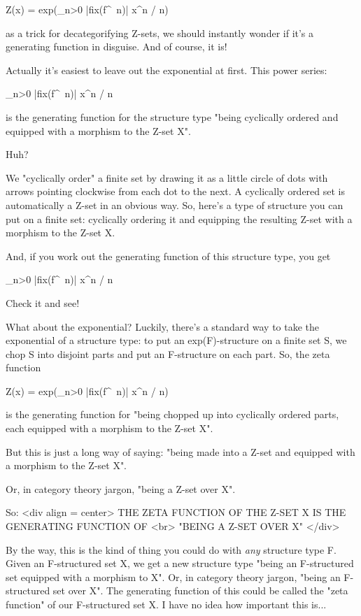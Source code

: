 Z(x) = exp(\sum_{n>0} |fix(f^{\ n})| x^{n} / n)

as a trick for decategorifying Z-sets, we should instantly wonder if it's 
a generating function in disguise.  And of course, it is!

Actually it's easiest to leave out the exponential at first.  This power
series:

\sum_{n>0} |fix(f^{\ n})| x^{n} / n

is the generating function for the structure type "being cyclically 
ordered and equipped with a morphism to the Z-set X".   

Huh?

We "cyclically order" a finite set by drawing it as a little circle of dots 
with arrows pointing clockwise from each dot to the next.  A cyclically 
ordered set is automatically a Z-set in an obvious way.   So, here's a type 
of structure you can put on a finite set: cyclically ordering it and 
equipping the resulting Z-set with a morphism to the Z-set X.  

And, if you work out the generating function of this structure type, you get 

\sum_{n>0} |fix(f^{\ n})| x^{n} / n

Check it and see!  

What about the exponential?  Luckily, there's a standard way to take the 
exponential of a structure type: to put an exp(F)-structure on a finite set 
S, we chop S into disjoint parts and put an F-structure on each part.  So, 
the zeta function

Z(x) = exp(\sum_{n>0} |fix(f^{\ n})| x^{n} / n)

is the generating function for "being chopped up into cyclically ordered 
parts, each equipped with a morphism to the Z-set X". 

But this is just a long way of saying: "being made into a Z-set
and equipped with a morphism to the Z-set X".

Or, in category theory jargon, "being a Z-set over X".

So: 
<div align = center>
     THE ZETA FUNCTION OF THE Z-SET X IS THE GENERATING FUNCTION OF <br>
                      "BEING A Z-SET OVER X"
</div>

By the way, this is the kind of thing you could do with \emph{any}
structure type F.  Given an F-structured set X, we get a new structure
type "being an F-structured set equipped with a morphism to
X".  Or, in category theory jargon, "being an F-structured
set over X".  The generating function of this could be called the
"zeta function" of our F-structured set X.  I have no idea
how important this is...

